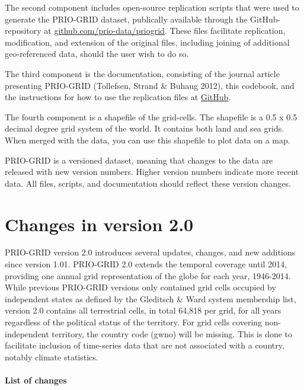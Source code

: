 \documentclass[]{book}
\begin{document}
The second component includes open-source replication scripts that were
used to generate the PRIO-GRID dataset, publically available through the
GitHub-repository at
\href{http://www.github.com/prio-data/priogrid}{github.com/prio-data/priogrid}.
These files facilitate replication, modification, and extension of the
original files, including joining of additional geo-referenced data,
should the user wish to do so.

The third component is the documentation, consisting of the journal
article presenting PRIO-GRID (Tollefsen, Strand \& Buhaug 2012), this
codebook, and the instructions for how to use the replication files at
\href{http://www.github.com/prio-data/priogrid}{GitHub}.

The fourth component is a shapefile of the grid-cells. The shapefile is
a 0.5 x 0.5 decimal degree grid system of the world. It contains both
land and sea grids. When merged with the data, you can use this
shapefile to plot data on a map.

PRIO-GRID is a versioned dataset, meaning that changes to the data are
released with new version numbers. Higher version numbers indicate more
recent data. All files, scripts, and documentation should reflect these
version changes.

\section{Changes in version 2.0}\label{changes-in-version-2.0}

PRIO-GRID version 2.0 introduces several updates, changes, and new
additions since version 1.01. PRIO-GRID 2.0 extends the temporal
coverage until 2014, providing one annual grid representation of the
globe for each year, 1946-2014. While previous PRIO-GRID versions only
contained grid cells occupied by independent states as defined by the
Gleditsch \& Ward system membership list, version 2.0 contains all
terrestrial cells, in total 64,818 per grid, for all years regardless of
the political status of the territory. For grid cells covering
non-independent territory, the country code (gwno) will be missing. This
is done to facilitate inclusion of time-series data that are not
associated with a country, notably climate statistics.

\paragraph{List of changes}\label{list-of-changes}
\end{document}
